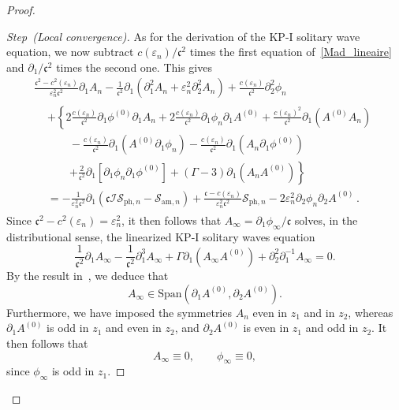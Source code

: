\documentclass[AHL,Unicode,longabstracts,published]{cedram}
\newcommand*\p{\partial}
\newcommand{\amm}{\mathrm{am}}
\newcommand{\phl}{\mathrm{ph}}
\newcommand{\Span}{\mathrm{Span}}
\newcommand*\BI{\mathcal{I}}
\newcommand*\BS{\mathcal{S}}
\newcommand*\cs{{\mathfrak c}}
\newcommand*\ii{\infty}
\newcommand*\e{\varepsilon}
\newcommand*\G{\Gamma}
\newcounter{stepcount}
\newenvironment{step}[1]{\refstepcounter{stepcount}\begin{proof}[{Step~\thestepcount}{\;(#1)}]}{\let\qed\relax\end{proof}}
\begin{document}
\begin{proof}
\begin{step}{{Local convergence}}
As for the derivation of the KP-I solitary wave equation, we now subtract $ c(\e_n) / \cs^2 $ times the first equation of~\eqref{Mad_lineaire} and $
\p_{1}/\cs^2 $ times the second one. This gives
\begin{multline}\label{desing_lineaire}
\frac{\cs^2 - c^2(\e_n) }{\e_n^2 \cs^2} \p_{1} A_n - \frac{1}{\cs^2} \p_{1} \left(\p_{1}^2 A_n + \e_n^2 \p_2^2 A_n\right) + \frac{c(\e_n) }{ \cs^2} \p_2^2 \phi_n\\
\begin{aligned}
& +
\left\{ 2 \frac{c(\e_n)}{\cs^2} \p_{1} \phi^{(0)} \p_{1} A_n + 2 \frac{c(\e_n)}{\cs^2} \p_{1} \phi_n \p_{1} A^{(0)} + \frac{c(\e_n)^2}{\cs^2} \p_1 (A^{(0)} A_n)\right.\\
& \quad \quad - \frac{c(\e_n)}{\cs^2} \p_1 \left(A^{(0)} \p_{1} \phi_n\right) - \frac{c(\e_n)}{\cs^2} \p_1 \left(A_n \p_{1} \phi^{(0)}\right)\\
& \quad \quad\left. + \frac{2}{\cs^2} \p_{1} \left[\p_{1} \phi_n \p_{1} \phi^{(0)}\right] + (\Gamma - 3) \p_{1} \left(A_n A^{(0)}\right) \right\}
\\ & = - \frac{1}{\e_n^2 \cs^2} \p_{1} \left(\cs \BI \BS_{{\phl},n} - \BS_{{\amm},n}\right) + \frac{ \cs -c(\e_n) }{\e_n^2 \cs^2} \BS_{{\phl},n} - 2 \e_n^2 \p_{2} \phi_n \p_{2} A^{(0)}\,.
\end{aligned}
\end{multline}
Since $\cs^2 - c^2(\e_n) = \e_n^2 $, it then follows that $ A_\ii = \p_{1} \phi_\ii /\cs $ solves, in the distributional sense, the linearized KP-I solitary waves equation
\begin{equation}\label{SW_lineaire}
\frac{1}{\cs^2} \p_{1} A_\ii - \frac{1}{\cs^2} \p^3_{1} A_\ii + \G \p_{1} \left(A_\ii A^{(0)}\right) + \p_{2}^2 \p_{1}^{-1} A_\ii = 0.
\end{equation} By the result in~\cite[ Theorem~\ref{Lump_nondege}]{Liu_Wei_Lump}, we deduce that
\[
A_\ii \in \Span \left(\p_1 A^{(0)}, \p_2 A^{(0)}\right).
\]
Furthermore, we have imposed the symmetries $ A_n $ even in $z_1 $ and in $ z_2 $, whereas $ \p_1 A^{(0)} $ is odd in $z_1 $ and even in $ z_2 $, and $ \p_2 A^{(0)} $ is even in $ z_1 $ and odd in $z_2 $. It then follows that
\[
A_\ii \equiv 0,
\qquad
\phi_\ii \equiv 0,
\]
since $\phi_\ii $ is odd in $ z_1 $.
\end{step}



\end{proof}
\end{document}
